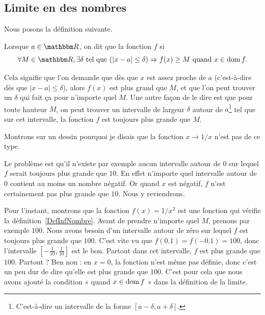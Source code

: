 \subsection{Limite en des nombres}

Nous posons la définition suivante.
\begin{definition}      \label{DefInfNombre}
Lorsque $a\in\eR$, on dit que la fonction $f$  si
\[
  \forall M\in\eR,\exists \delta\tq (| x-a |\leq \delta )\Rightarrow f(x)\geq M\text{ quand }x\in\dom f.
\]
\end{definition}
Cela signifie que l'on demande que dès que $x$ est assez proche de $a$ (c'est-à-dire dès que $| x-a |\leq\delta$), alors $f(x)$ est plus grand que $M$, et que l'on peut trouver un $\delta$ qui fait ça pour n'importe quel $M$. Une autre façon de le dire est que pour toute hauteur $M$, on peut trouver un intervalle de largeur $\delta$ autour de $a$\footnote{C'est-à-dire un intervalle de la forme $[a-\delta,a+\delta]$.} tel que sur cet intervalle, la fonction $f$ est toujours plus grande que $M$.

Montrons sur un dessin pourquoi je disais que la fonction $x\to 1/x$ n'est pas de ce type.


Le problème est qu'il n'existe par exemple aucun intervalle autour de $0$ sur lequel $f$ serait toujours plus grande que $10$. En effet n'importe quel intervalle autour de $0$ contient au moins un nombre négatif. Or quand $x$ est négatif, $f$ n'est certainement pas plus grande que $10$. Nous y reviendrons.

Pour l'instant, montrons que la fonction $f(x)=1/x^2$ est une fonction qui vérifie la définition~\ref{DefInfNombre}.  Avant de prendre n'importe quel $M$, prenons par exemple $100$. Nous avons besoin d'un intervalle autour de zéro sur lequel $f$ est toujours plus grande que $100$. C'est vite vu que $f(0.1)=f(-0.1)=100$, donc l'intervalle $[-\frac{ 1 }{ 10 },\frac{1}{ 10 }]$ est le bon. Partout dans cet intervalle, $f$ est plus grande que $100$. Partout ? Ben non : en $x=0$, la fonction n'est même pas définie, donc c'est un peu dur de dire qu'elle est plus grande que $100$. C'est pour cela que nous avons ajouté la condition « quand $x\in\operatorname{dom} f$ » dans la définition de la limite.

